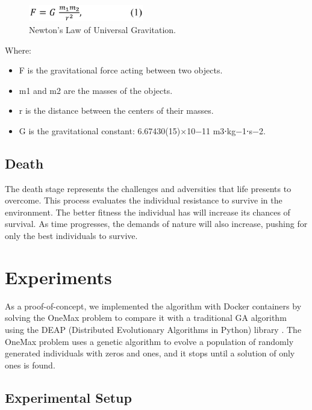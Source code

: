 \documentclass[graybox]{svmult}
\begin{document}
\begin{figure}
    \centering
    \includegraphics[width=50mm]{img/fig3_newtonslaw.pdf}
    \caption{Newton's Law of Universal Gravitation.} \label{fig.newtonslaw}
    \end{figure}

Where:
\begin{itemize}
    \item[]	    F is the gravitational force acting between two objects.
    \item[]	    m1 and m2 are the masses of the objects.
    \item[]	    r is the distance between the centers of their masses.
    \item[]	    G is the gravitational constant: 6.67430(15)×10−11 m3⋅kg−1⋅s−2.
\end{itemize}


\subsection{Death}

The death stage represents the challenges and adversities that life presents to
overcome. This process evaluates the individual resistance to survive in the
environment. The better fitness the individual has will increase its chances of
survival. As time progresses, the demands of nature will also increase, pushing
for only the best individuals to survive.


\section{Experiments}
\label{section.experiments}

As a proof-of-concept, we implemented the algorithm with Docker containers by
solving the OneMax problem to compare it with a traditional GA algorithm using
the DEAP (Distributed Evolutionary Algorithms in Python) library
\cite{fortin2012deap}. The OneMax problem \cite{krejca2020lower,witt2019upper}
uses a genetic algorithm to evolve a population of randomly generated
individuals with zeros and ones, and it stops until a solution of only ones is
found.

\subsection{Experimental Setup}
\end{document}
